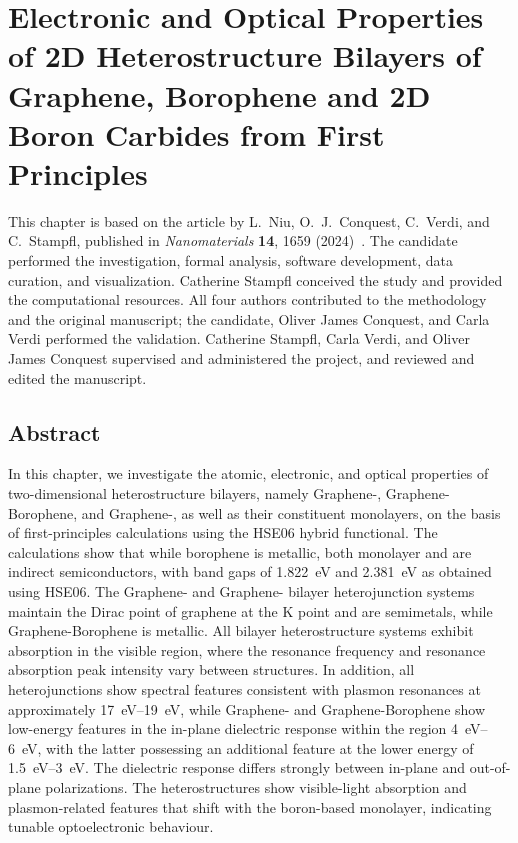 \chapter[Optoelectronics of Carbon-Boron Heterostructures]{Electronic and Optical Properties of 2D Heterostructure Bilayers of Graphene, Borophene and 2D Boron Carbides from First Principles}
\label{cha:project_bilayers}

This chapter is based on the article by L.~Niu, O.~J.~Conquest, C.~Verdi, and C.~Stampfl,
published in \textit{Nanomaterials} \textbf{14}, 1659 (2024)~\cite{niu2024electronic}.
The candidate performed the investigation, formal analysis, software development, data curation, and visualization.
Catherine Stampfl conceived the study and provided the computational resources.
All four authors contributed to the methodology and the original manuscript;
the candidate, Oliver James Conquest, and Carla Verdi performed the validation.
Catherine Stampfl, Carla Verdi, and Oliver James Conquest supervised and administered the project, and reviewed and edited the manuscript.

\FloatBarrier
\section{Abstract}
\label{1_abstract}

In this chapter,
we investigate the atomic, electronic, and optical properties of two-dimensional heterostructure bilayers,
namely Graphene-, Graphene-Borophene, and Graphene-,
as well as their constituent monolayers, on the basis of first-principles calculations using the HSE06 hybrid functional.
The calculations show that while borophene is metallic,
both monolayer  and  are indirect semiconductors,
with band gaps of \qty{1.822}{\electronvolt} and \qty{2.381}{\electronvolt} as obtained using HSE06.
The Graphene- and Graphene- bilayer heterojunction systems maintain the Dirac point of graphene at the $\mathrm{K}$ point and are semimetals,
while Graphene-Borophene is metallic.
All bilayer heterostructure systems exhibit absorption in the visible region, where the resonance frequency and resonance absorption peak intensity vary between structures.
In addition, all heterojunctions show spectral features consistent with plasmon resonances at approximately \qtyrange{17}{19}{\electronvolt}, while Graphene- and Graphene-Borophene show low-energy features in the in-plane dielectric response within the region \qtyrange{4}{6}{\electronvolt},
with the latter possessing an additional feature at the lower energy of \qtyrange{1.5}{3}{\electronvolt}.
The dielectric response differs strongly between in-plane and out-of-plane polarizations.
The heterostructures show visible-light absorption and plasmon-related features that shift with the boron-based monolayer, indicating tunable optoelectronic behaviour.

